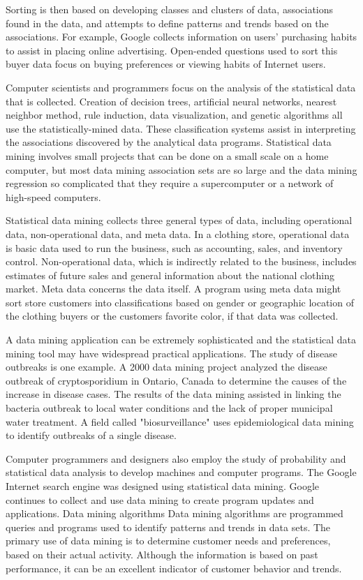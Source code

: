 Sorting is then based on developing classes and clusters of data, associations found in the data, and attempts to define patterns and trends based on the associations. For example, Google collects information on users' purchasing habits to assist in placing online advertising. Open-ended questions used to sort this buyer data focus on buying preferences or viewing habits of Internet users.
 
Computer scientists and programmers focus on the analysis of the statistical data that is collected. Creation of decision trees, artificial neural networks, nearest neighbor method, rule induction, data visualization, and genetic algorithms all use the statistically-mined data. These classification systems assist in interpreting the associations discovered by the analytical data programs. Statistical data mining involves small projects that can be done on a small scale on a home computer, but most data mining association sets are so large and the data mining regression so complicated that they require a supercomputer or a network of high-speed computers.
 
Statistical data mining collects three general types of data, including operational data, non-operational data, and meta data. In a clothing store, operational data is basic data used to run the business, such as accounting, sales, and inventory control. Non-operational data, which is indirectly related to the business, includes estimates of future sales and general information about the national clothing market. Meta data concerns the data itself. A program using meta data might sort store customers into classifications based on gender or geographic location of the clothing buyers or the customers favorite color, if that data was collected.
 
A data mining application can be extremely sophisticated and the statistical data mining tool may have widespread practical applications. The study of disease outbreaks is one example. A 2000 data mining project analyzed the disease outbreak of cryptosporidium in Ontario, Canada to determine the causes of the increase in disease cases. The results of the data mining assisted in linking the bacteria outbreak to local water conditions and the lack of proper municipal water treatment. A field called "biosurveillance" uses epidemiological data mining to identify outbreaks of a single disease.
 
Computer programmers and designers also employ the study of probability and statistical data analysis to develop machines and computer programs. The Google Internet search engine was designed using statistical data mining. Google continues to collect and use data mining to create program updates and applications.
Data mining algorithms
Data mining algorithms are programmed queries and programs used to identify patterns and trends in data sets. The primary use of data mining is to determine customer needs and preferences, based on their actual activity. Although the information is based on past performance, it can be an excellent indicator of customer behavior and trends.
 
